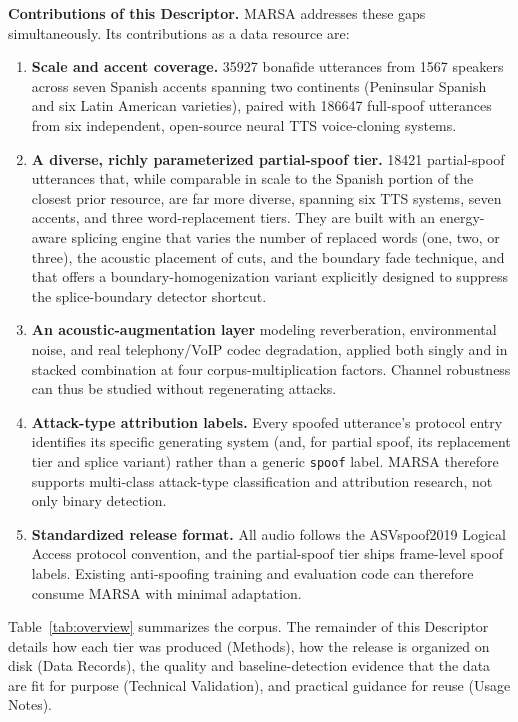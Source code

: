 \documentclass[11pt]{article}
\begin{document}
\textbf{Contributions of this Descriptor.} MARSA addresses these gaps simultaneously. Its contributions as a data resource are:
\begin{enumerate}
  \item \textbf{Scale and accent coverage.} 35927 bonafide
  utterances from 1567 speakers across seven Spanish accents spanning
  two continents (Peninsular Spanish and six Latin American varieties),
  paired with 186647 full-spoof utterances from six independent,
  open-source neural TTS voice-cloning systems.
  \item \textbf{A diverse, richly parameterized partial-spoof tier.}
  18421 partial-spoof utterances that, while comparable in scale to
  the Spanish portion of the closest prior resource, are far more
  diverse, spanning six TTS systems, seven accents, and three
  word-replacement tiers. They are built with an energy-aware splicing
  engine that varies the number of replaced words (one, two, or three),
  the acoustic placement of cuts, and the boundary fade technique, and
  that offers a boundary-homogenization variant explicitly designed to
  suppress the splice-boundary detector shortcut.
  \item \textbf{An acoustic-augmentation layer} modeling reverberation,
  environmental noise, and real telephony/VoIP codec degradation, applied
  both singly and in stacked combination at four corpus-multiplication
  factors. Channel robustness can thus be studied without regenerating
  attacks.
  \item \textbf{Attack-type attribution labels.} Every spoofed
  utterance's protocol entry identifies its specific generating system
  (and, for partial spoof, its replacement tier and splice variant)
  rather than a generic \texttt{spoof} label. MARSA therefore supports
  multi-class attack-type classification and attribution research, not
  only binary detection.
  \item \textbf{Standardized release format.} All audio follows the
  ASVspoof2019 Logical Access protocol convention, and the partial-spoof
  tier ships frame-level spoof labels. Existing anti-spoofing training
  and evaluation code can therefore consume MARSA with minimal
  adaptation.
\end{enumerate}

Table~\ref{tab:overview} summarizes the corpus. The remainder of this
Descriptor details how each tier was produced (Methods), how the release
is organized on disk (Data Records), the quality and baseline-detection
evidence that the data are fit for purpose (Technical Validation), and
practical guidance for reuse (Usage Notes).
\end{document}
